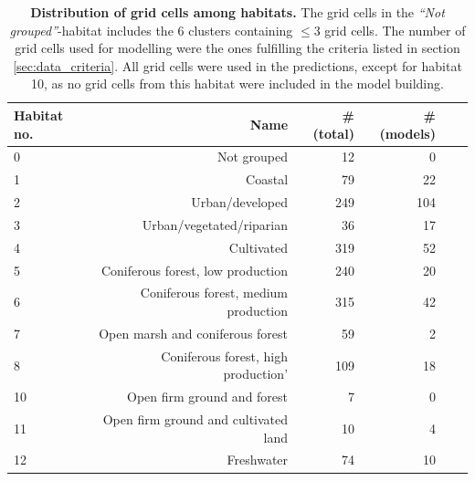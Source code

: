 \documentclass{article}
\begin{document}
\begin{table}[h]
    \caption{\textbf{Distribution of grid cells among habitats.} The grid cells in the \textit{``Not grouped''}-habitat includes the 6 clusters containing $\leq{3}$ grid cells. The number of grid cells used for modelling were the ones fulfilling the criteria listed in section \ref{sec:data_criteria}. All grid cells were used in the predictions, except for habitat 10, as no grid cells from this habitat were included in the model building.}
    \label{table:clusters}
    \begin{tabular}{l r r r r r}
    \textbf{Habitat no.} &   \textbf{Name}    &    \textbf{ \# (total)} &    \textbf{ \# (models)}      \\
    \hline
    0           &   Not grouped     &   12                      &   0                                   \\
    1           &   Coastal         &   79                      &   22                                  \\
    2           &   Urban/developed &   249                     &   104                                 \\
    3           &   Urban/vegetated/riparian    &   36          &   17                                  \\
    4           &   Cultivated      &   319                     &   52                                  \\
    5           &   Coniferous forest, low production   &   240 &   20                                  \\
    6           &   Coniferous forest, medium production    &   315 &   42                              \\
    7           &   Open marsh and coniferous forest    &   59  &   2                                   \\
    8           &   Coniferous forest, high production' &   109 &   18                                  \\
    10          &   Open firm ground and forest &   7           &   0                                   \\
    11          &   Open firm ground and cultivated land    &   10  &   4                               \\
    12          &   Freshwater      &   74                      &   10                                  \\
    \end{tabular}
\end{table}
\end{document}
